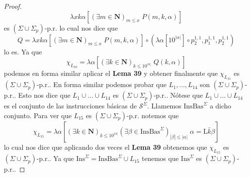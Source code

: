 \begin{lemma}
\begin{proof}
\[      \displaystyle \lambda xk\alpha \left[ (\exists m\in \mathbf{N})_{m\leq x}\;P(m,k,\alpha ) \right]
    \]
    es $(\Sigma \cup \Sigma _{p})$-p.r. lo cual nos dice que
    \[
      \displaystyle Q=\lambda xk\alpha \left[ (\exists m\in \mathbf{N})_{m\leq x}\;P(m,k,\alpha ) \right] \circ
      (\lambda \alpha \left[ 10^{\left\vert \alpha \right\vert } \right] \circ p_{2}^{1,1},p_{1}^{1,1},p_{2}^{1,1})
    \]
    lo es. Ya que
    \[
      \displaystyle \chi _{L_{10}}=\lambda \alpha \left[ (\exists k\in \mathbf{N})_{k\leq 10^{\left\vert \alpha \right
      \vert }}\;Q(k,\alpha )\right]
    \]
    podemos en forma similar aplicar el \textbf{Lema 39} y obtener finalmente que $\chi _{L_{11}}$ es
    $(\Sigma \cup \Sigma _{p})$-p.r..
    En forma similar podemos probar que $L_{1},...,L_{14}$ son $(\Sigma \cup \Sigma _{p})$-p.r..
    Esto nos dice que $L_{1}\cup ...\cup L_{14}$ es $(\Sigma \cup \Sigma _{p})$-p.r..
    Nótese que $L_{1}\cup ...\cup L_{14}$ es el conjunto de las instrucciones básicas de $\mathcal{S}^{\Sigma }$.
    Llamemos $ \mathrm{InsBas}^{\Sigma }$ a dicho conjunto.
    Para ver que $L_{15}$ es $ (\Sigma \cup \Sigma _{p})$-p.r. notemos que
    \[
      \displaystyle \chi _{L_{15}}=\lambda \alpha \left[ (\exists k\in \mathbf{N})_{k\leq 10^{\left\vert \alpha \right
      \vert }}(\exists \beta \in \mathrm{InsBas} ^{\Sigma })_{\left\vert \beta \right\vert \leq \left\vert \alpha \right
      \vert }\;\alpha =\mathrm{L}\bar{k}\beta \right]
    \]
    lo cual nos dice que aplicando dos veces el \textbf{Lema 39} obtenemos que $\chi _{L_{15}}$ es $(\Sigma \cup \Sigma _{p})
    $-p.r.. Ya que $ \mathrm{Ins}^{\Sigma }=\mathrm{InsBas}^{\Sigma }\cup L_{15}$ tenemos que
    $ \mathrm{Ins}^{\Sigma }$ es $(\Sigma \cup \Sigma _{p})$-p.r..
  \end{proof}
  \end{lemma}


